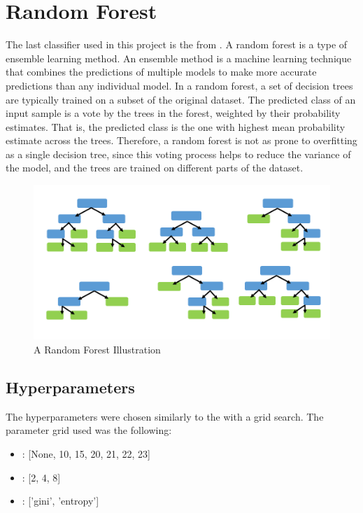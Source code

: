 \section{Random Forest}
The last classifier used in this project is the  from .
A random forest is a type of ensemble learning method.
An ensemble method is a machine learning technique that combines the predictions of multiple models to make more accurate predictions than any individual model.
In a random forest, a set of decision trees are typically trained on a subset of the original dataset.
The predicted class of an input sample is a vote by the trees in the forest, weighted by their probability estimates.
That is, the predicted class is the one with highest mean probability estimate across the trees.
Therefore, a random forest is not as prone to overfitting as a single decision tree, since this voting process helps to reduce the variance of the model, and the trees are trained on different parts of the dataset.

\begin{figure}[H]
    \centering
    \includegraphics[scale=0.3]{figures_for_report/random_forest_simple_example}
    \captionsetup{justification=centering,margin=2cm}
    \caption{A Random Forest Illustration}\label{fig:figure}
\end{figure}


\subsection{Hyperparameters}\label{subsec:hyperparameters}
The hyperparameters were chosen similarly to the  with a grid search.
The parameter grid used was the following:\\

\begin{center}
    \begin{minipage}{4in}
\begin{itemize}
    \item {}: [None, 10, 15, 20, 21, 22, 23]
    \item {}: [2, 4, 8]
    \item {}: ['gini', 'entropy'] \\
\end{itemize}
            \end{minipage}
\end{center}

